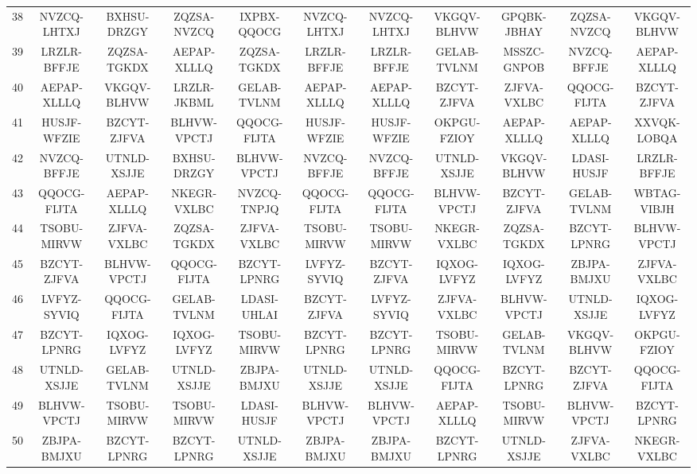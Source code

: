 \begin{landscape}
{\begin{longtable}{ccccccccccc}
38 &  NVZCQ-LHTXJ &  BXHSU-DRZGY &  ZQZSA-NVZCQ &  IXPBX-QQOCG &  NVZCQ-LHTXJ &  NVZCQ-LHTXJ &  VKGQV-BLHVW &  GPQBK-JBHAY &  ZQZSA-NVZCQ &  VKGQV-BLHVW \\
39 &  LRZLR-BFFJE &  ZQZSA-TGKDX &  AEPAP-XLLLQ &  ZQZSA-TGKDX &  LRZLR-BFFJE &  LRZLR-BFFJE &  GELAB-TVLNM &  MSSZC-GNPOB &  NVZCQ-BFFJE &  AEPAP-XLLLQ \\
40 &  AEPAP-XLLLQ &  VKGQV-BLHVW &  LRZLR-JKBML &  GELAB-TVLNM &  AEPAP-XLLLQ &  AEPAP-XLLLQ &  BZCYT-ZJFVA &  ZJFVA-VXLBC &  QQOCG-FIJTA &  BZCYT-ZJFVA \\
41 &  HUSJF-WFZIE &  BZCYT-ZJFVA &  BLHVW-VPCTJ &  QQOCG-FIJTA &  HUSJF-WFZIE &  HUSJF-WFZIE &  OKPGU-FZIOY &  AEPAP-XLLLQ &  AEPAP-XLLLQ &  XXVQK-LOBQA \\
42 &  NVZCQ-BFFJE &  UTNLD-XSJJE &  BXHSU-DRZGY &  BLHVW-VPCTJ &  NVZCQ-BFFJE &  NVZCQ-BFFJE &  UTNLD-XSJJE &  VKGQV-BLHVW &  LDASI-HUSJF &  LRZLR-BFFJE \\
43 &  QQOCG-FIJTA &  AEPAP-XLLLQ &  NKEGR-VXLBC &  NVZCQ-TNPJQ &  QQOCG-FIJTA &  QQOCG-FIJTA &  BLHVW-VPCTJ &  BZCYT-ZJFVA &  GELAB-TVLNM &  WBTAG-VIBJH \\
44 &  TSOBU-MIRVW &  ZJFVA-VXLBC &  ZQZSA-TGKDX &  ZJFVA-VXLBC &  TSOBU-MIRVW &  TSOBU-MIRVW &  NKEGR-VXLBC &  ZQZSA-TGKDX &  BZCYT-LPNRG &  BLHVW-VPCTJ \\
45 &  BZCYT-ZJFVA &  BLHVW-VPCTJ &  QQOCG-FIJTA &  BZCYT-LPNRG &  LVFYZ-SYVIQ &  BZCYT-ZJFVA &  IQXOG-LVFYZ &  IQXOG-LVFYZ &  ZBJPA-BMJXU &  ZJFVA-VXLBC \\
46 &  LVFYZ-SYVIQ &  QQOCG-FIJTA &  GELAB-TVLNM &  LDASI-UHLAI &  BZCYT-ZJFVA &  LVFYZ-SYVIQ &  ZJFVA-VXLBC &  BLHVW-VPCTJ &  UTNLD-XSJJE &  IQXOG-LVFYZ \\
47 &  BZCYT-LPNRG &  IQXOG-LVFYZ &  IQXOG-LVFYZ &  TSOBU-MIRVW &  BZCYT-LPNRG &  BZCYT-LPNRG &  TSOBU-MIRVW &  GELAB-TVLNM &  VKGQV-BLHVW &  OKPGU-FZIOY \\
48 &  UTNLD-XSJJE &  GELAB-TVLNM &  UTNLD-XSJJE &  ZBJPA-BMJXU &  UTNLD-XSJJE &  UTNLD-XSJJE &  QQOCG-FIJTA &  BZCYT-LPNRG &  BZCYT-ZJFVA &  QQOCG-FIJTA \\
49 &  BLHVW-VPCTJ &  TSOBU-MIRVW &  TSOBU-MIRVW &  LDASI-HUSJF &  BLHVW-VPCTJ &  BLHVW-VPCTJ &  AEPAP-XLLLQ &  TSOBU-MIRVW &  BLHVW-VPCTJ &  BZCYT-LPNRG \\
50 &  ZBJPA-BMJXU &  BZCYT-LPNRG &  BZCYT-LPNRG &  UTNLD-XSJJE &  ZBJPA-BMJXU &  ZBJPA-BMJXU &  BZCYT-LPNRG &  UTNLD-XSJJE &  ZJFVA-VXLBC &  NKEGR-VXLBC \\
\end{longtable}
}
\end{landscape}